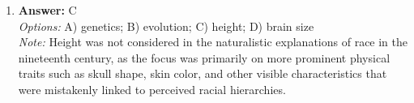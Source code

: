 \documentclass[12pt]{article}
\begin{document}
\begin{enumerate}[label=\arabic*.]
\\ \textit{Note:} Ethnographic research is designed to immerse the researcher in the community being studied, allowing for the collection of in-depth, nuanced descriptions and interpretations of social phenomena from the perspective of those within that culture, which ultimately results in qualitative data.
\item \textbf{Answer:} C
\\ \textit{Options:} A) genetics; B) evolution; C) height; D) brain size
\\ \textit{Note:} Height was not considered in the naturalistic explanations of race in the nineteenth century, as the focus was primarily on more prominent physical traits such as skull shape, skin color, and other visible characteristics that were mistakenly linked to perceived racial hierarchies.
\end{enumerate}
\end{document}
